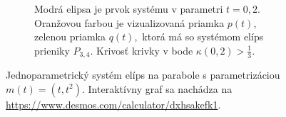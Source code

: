 \begin{figure}[h]
\begin{subfigure}[b]{0.49\textwidth}
        	\caption{Modrá elipsa je prvok systému v parametri $t=0,2.$ Oranžovou farbou je vizualizovaná priamka $p(t)$, zelenou priamka $q(t),$ ktorá má so systémom elíps prieniky $P_{3,4}$. Krivosť krivky v bode $\kappa(0,2) > \frac{1}{3}.$}
        \label{fig:parabola_2}
    \end{subfigure}
    	\caption[Jednoparametrický systém elíps.]{Jednoparametrický systém elíps na parabole s parametrizáciou $m(t)=(t, t^2)$. Interaktívny graf sa nachádza na \url{https://www.desmos.com/calculator/dxhsakefk1}.}
    \label{fig:parabola}
\end{figure}


